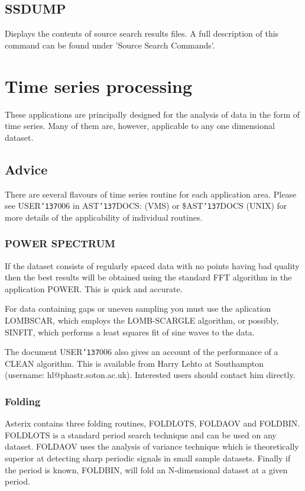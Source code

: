 \documentclass{book}
\renewcommand{\_}{{\tt\char'137}}     %
\begin{document}
\section{SSDUMP}
Displays the contents of source search results files. A full
description of this command can be found under 'Source Search
Commands'.

\chapter{Time series processing}
These applications are principally designed for the analysis of
data in the form of time series. Many of them are, however,
applicable to any one dimensional dataset.

\section{Advice}
There are several flavours of time series routine for each
application area. Please see USER\_006 in AST\_DOCS: (VMS) or
\$AST\_DOCS (UNIX) for more details of the applicability of
individual routines.
\subsection{POWER SPECTRUM}
If the dataset consists of regularly spaced data with no points
having bad quality then the best results will be obtained using
the standard FFT algorithm in the application POWER. This is quick
and accurate.

For data containing gaps or uneven sampling you must use the
aplication LOMBSCAR, which employs the LOMB-SCARGLE algorithm, or
possibly, SINFIT, which performs a least squares fit of sine waves
to the data.

The document USER\_006 also gives an account of the performance
of a CLEAN algorithm. This is available from Harry Lehto at
Southampton (username: hl@phastr.soton.ac.uk). Interested users should
contact him directly.

\subsection{Folding}
Asterix contains three folding routines, FOLDLOTS, FOLDAOV and
FOLDBIN. FOLDLOTS is a standard period search technique and can
be used on any dataset. FOLDAOV uses the analysis of variance
technique which is theoretically superior at detecting sharp
periodic signals in small sample datasets. Finally if the period
is known, FOLDBIN, will fold an N-dimensional dataset at a given
period.
\end{document}

